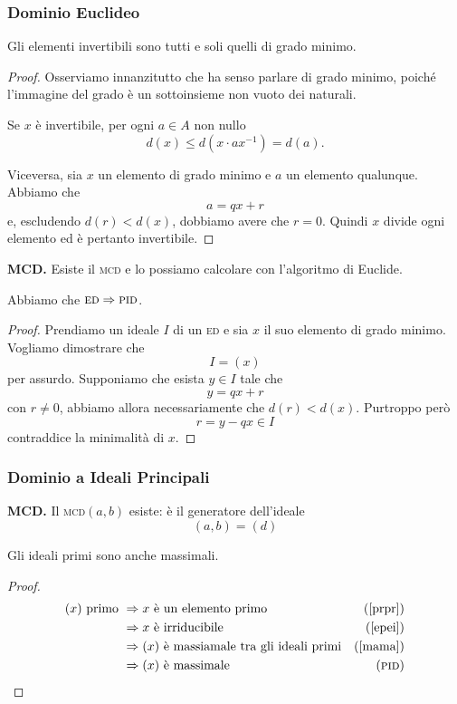 \begin{multicols}{2}
\subsubsection{Dominio Euclideo}

\begin{prop}
	Gli elementi invertibili sono tutti e soli quelli di grado minimo.
\end{prop}
\begin{proof}
	Osserviamo innanzitutto che ha senso parlare di grado minimo, poiché l'immagine del grado è un sottoinsieme non vuoto dei naturali.
	
	Se $ x $ è invertibile, per ogni $ a \in A $ non nullo
	\[ d(x) \leq d(x \cdot ax^{-1}) = d(a). \]
	
	Viceversa, sia $ x $ un elemento di grado minimo e $ a $ un elemento qualunque. Abbiamo che
	\[ a = qx + r \]
	e, escludendo $ d(r) < d(x) $, dobbiamo avere che $ r = 0 $. Quindi $ x $ divide ogni elemento ed è pertanto invertibile. 
\end{proof}


\textbf{MCD.} Esiste il \textsc{mcd} e lo possiamo calcolare con l'algoritmo di Euclide.

	
\begin{prop}\label{abc}
	 Abbiamo che $ \textsc{ed}\Rightarrow\textsc{pid}$.
\end{prop}
\begin{proof}
	Prendiamo un ideale $ I $ di un \textsc{ed} e sia $ x $ il suo elemento di grado minimo. Vogliamo dimostrare che 
	\[ I = (x) \]
	per assurdo. Supponiamo che esista $ y \in I $ tale che
	\[ y = qx + r \]
	con $ r \neq 0 $, abbiamo allora necessariamente che $ d(r) < d(x) $. Purtroppo però
	\[ r = y - qx \in I \]
	contraddice la minimalità di $ x $.
\end{proof}

\subsubsection{Dominio a Ideali Principali}

\textbf{MCD.} Il \textsc{mcd}$ (a, b) $ esiste: è il generatore dell'ideale $$  (a, b) = (d)  $$


\begin{theorem}\label{primossemassimale}
	Gli ideali primi sono anche massimali.
\end{theorem}
\begin{proof}
	\begin{align*}
		(x) \text{ primo } & \Rightarrow x \text{ è un elemento primo} & \text{(\ref{prpr})} \\
		& \Rightarrow x \text{ è irriducibile} &\text{(\ref{epei})} \\
		& \Rightarrow (x) \text{ è massiamale tra gli ideali primi} &\text{(\ref{mama})} \\
		& \Rightarrow (x) \text{ è massimale} &\text{(\textsc{pid})}
	\end{align*}
\end{proof}


\end{multicols}
